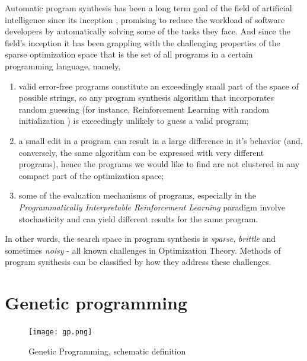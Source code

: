 Automatic program synthesis has been a long term goal of the field of artificial intelligence since its inception \cite{mannaAutomaticProgramSynthesis1971}, promising to reduce the workload of software developers by automatically solving some of the tasks they face.
And since the field's inception it has been grappling with the challenging properties of the sparse optimization space \cite{alurSyntaxguidedSynthesis2013, davidProgramSynthesisChallenges2017} that is the set of all programs in a certain programming language, namely, 
\begin{enumerate}
    \item valid error-free programs constitute an exceedingly small part of the space of possible strings, so any program synthesis algorithm that incorporates random guessing (for instance, Reinforcement Learning with random initialization \cite{suttonReinforcementLearningSecond2018}) is exceedingly unlikely to guess a valid program;
    \item a small edit in a program can result in a large difference in it's behavior (and, conversely, the same algorithm can be expressed with very different programs), hence the programs we would like to find are not clustered in any compact part of the optimization space;
    \item some of the evaluation mechanisms of programs, especially in the \emph{Programmatically Interpretable Reinforcement Learning} paradigm involve stochasticity and can yield different results for the same program.
\end{enumerate}

In other words, the search space in program synthesis is \emph{sparse}, \emph{brittle} and sometimes \emph{noisy} \cite{arnoldNoisyOptimizationEvolution2002} - all known challenges in Optimization Theory.
Methods of program synthesis can be classified by how they address these challenges.

\newpage
\section{Genetic programming}
\label{sec:gp}

\begin{figure}[H]
    \centering
    \texttt{[image: gp.png]}
    \caption{Genetic Programming, schematic definition}
    \label{fig:gp}
\end{figure}

